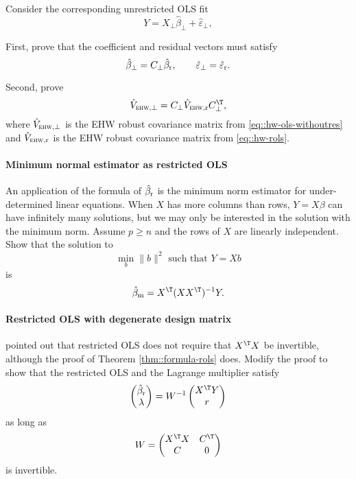 Consider the corresponding unrestricted OLS fit
\begin{equation}
\label{eq::hw-ols-withoutres}
Y =X_{\perp} \hat\beta_\perp  +  \hat{\varepsilon}_\perp , 
\end{equation}

First, prove that the coefficient and residual vectors must satisfy
$$
\hat\beta_\perp = C_\perp  \hat{\beta}_\textup{r}  , \qquad 
\hat{\varepsilon}_\perp = \hat{\varepsilon}_\textup{r}  . 
$$


Second, prove  
$$
\hat{V}_{\textsc{ehw}, \perp} =  C_\perp \hat{V}_{\textsc{ehw}, \textup{r}}  C_\perp^{\T} , 
$$
where $\hat{V}_{\textsc{ehw}, \perp} $ is the EHW robust covariance matrix from \eqref{eq::hw-ols-withoutres} and  $\hat{V}_{\textsc{ehw}, \textup{r}} $ is the EHW robust covariance matrix from \eqref{eq::hw-rols}. 




 


\paragraph{Minimum normal estimator as restricted OLS}
\label{para::minimum-norm-rols}


An application of the formula of $\hat{\beta}_\textup{r} $ is the minimum norm estimator for under-determined linear equations. When $X$ has more columns than rows, $Y=X\beta$ can have infinitely many solutions, but we may only be interested in the solution with the minimum norm. Assume $p\geq n$ and the rows of $X$ are linearly independent. Show that the solution to
$$
\min_b \| b\|^2 \text{ such that } Y = Xb
$$
is
$$
\hat{\beta}_\text{m} = X^{\T} (X X^{\T})^{-1} Y.
$$
 




\paragraph{Restricted OLS with degenerate design matrix}
\label{para::rols-degenerate-greene}


\citet{greene} pointed out that restricted OLS does not require that $X^{\T} X$ be invertible, although the proof of Theorem \ref{thm::formula-rols} does. Modify the proof to show that the restricted OLS and the Lagrange multiplier satisfy 
$$
\begin{pmatrix}
\hat{\beta}_\textup{r}  \\
\lambda 
\end{pmatrix}
= 
W^{-1}
\begin{pmatrix}
X^{\T} Y \\
r
\end{pmatrix}
$$
as long as 
$$
W = 
\begin{pmatrix}
X^{\T} X &  C^{\T} \\
C & 0 
\end{pmatrix}
$$
is invertible. 



